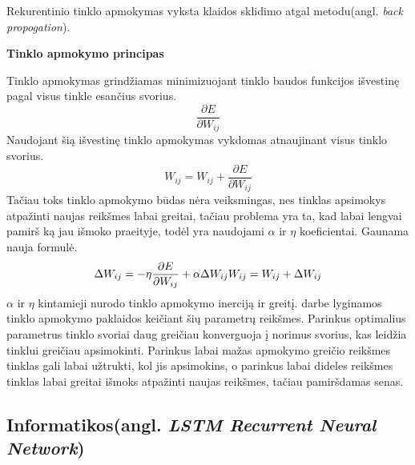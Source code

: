 Rekurentinio tinklo apmokymas vyksta klaidos sklidimo atgal metodu(angl. \textit{back propogation}).

\textbf{Tinklo apmokymo principas}

Tinklo apmokymas grindžiamas minimizuojant tinklo baudos funkcijos išvestinę pagal visus tinkle esančius svorius.
    \begin{equation*}
      \frac{\partial E}{\partial W_{ij}}
    \end{equation*}
Naudojant šią išvestinę tinklo apmokymas vykdomas atnaujinant visus tinklo svorius.
    \begin{equation*}
      W_{ij} = W_{ij} + \frac{\partial E}{\partial W_{ij}}
    \end{equation*}
Tačiau toks tinklo apmokymo būdas nėra veiksmingas, nes tinklas apsimokys atpažinti naujas reikšmes labai greitai, tačiau problema yra ta, kad labai lengvai pamirš ką jau išmoko praeityje, todėl yra naudojami $\alpha$ ir $\eta$ koeficientai. Gaunama nauja formulė.
\begin{equation*}
  \Delta W_{ij} =-\eta\frac{\partial E}{\partial W_{ij}}+\alpha \Delta W_{ij} \\
    W_{ij} = W_{ij} + \Delta W_{ij}
\end{equation*}
$\alpha$ ir $\eta$ kintamieji nurodo tinklo apmokymo inerciją ir greitį. \cite{Deividas2018} darbe lyginamos tinklo apmokymo paklaidos keičiant šių parametrų reikšmes. Parinkus optimalius parametrus tinklo svoriai daug greičiau konverguoja į norimus svorius, kas leidžia tinklui greičiau apsimokinti. Parinkus labai mažas apmokymo greičio reikšmes tinklas gali labai užtrukti, kol jis apsimokins, o parinkus labai dideles reikšmes tinklas labai greitai išmoks atpažinti naujas reikšmes, tačiau pamiršdamas senas.


\subsection{ Informatikos(angl. \textit{LSTM Recurrent Neural Network})}



%
%
%
%
%
%
%
%
%
%
%
%
%
%
%
%
%


%
%
%
%
%
%
%
%
%
%
